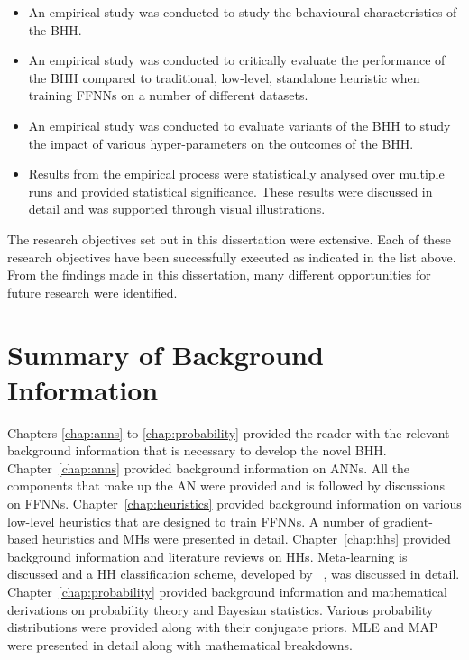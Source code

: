 \begin{itemize}
      \item An empirical study was conducted to study the behavioural characteristics of the \acs{BHH}.

      \item An empirical study was conducted to critically evaluate the performance of the \acs{BHH} compared to traditional, low-level, standalone heuristic when training \acp{FFNN} on a number of different datasets.

      \item An empirical study was conducted to evaluate variants of the \acs{BHH} to study the impact of various hyper-parameters on the outcomes of the \ac{BHH}.

      \item Results from the empirical process were statistically analysed over multiple runs and provided statistical significance. These results were discussed in detail and was supported through visual illustrations.
\end{itemize}

The research objectives set out in this dissertation were extensive. Each of these research objectives have been successfully executed as indicated in the list above. From the findings made in this dissertation, many different opportunities for future research were identified.


\section{Summary of Background Information}
\label{sec:conclusion:background_info}

Chapters \ref{chap:anns} to \ref{chap:probability} provided the reader with the relevant background information that is necessary to develop the novel \acs{BHH}. Chapter~\ref{chap:anns} provided background information on \acp{ANN}. All the components that make up the \acs{AN} were provided and is followed by discussions on \acp{FFNN}. Chapter~\ref{chap:heuristics} provided background information on various low-level heuristics that are designed to train \acp{FFNN}. A number of gradient-based heuristics and \acp{MH} were presented in detail. Chapter~\ref{chap:hhs} provided background information and literature reviews on \acp{HH}. Meta-learning is discussed and a \acs{HH} classification scheme, developed by \citeauthor{ref:burke:2010}~\cite{ref:burke:2010}, was discussed in detail. Chapter~\ref{chap:probability} provided background information and mathematical derivations on probability theory and Bayesian statistics. Various probability distributions were provided along with their conjugate priors. \acs{MLE} and \acs{MAP} were presented in detail along with mathematical breakdowns.

